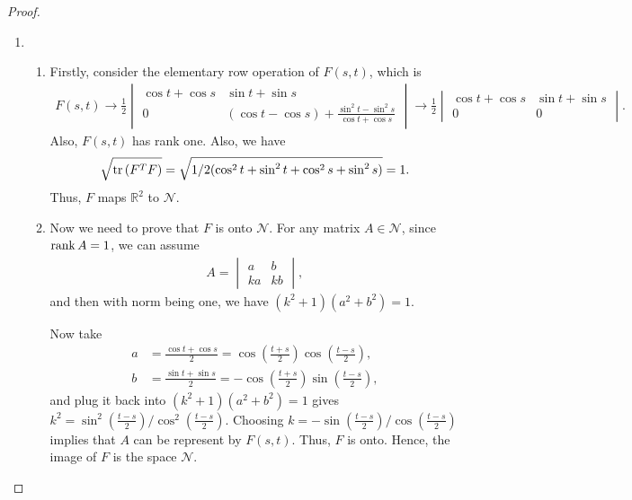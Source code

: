 \documentclass[11pt]{article}
\theoremstyle{definition}
\numberwithin{equation}{subsection}
\begin{document}
\begin{proof}
~\begin{enumerate}[label=(\alph*)]
    \item \begin{enumerate}[label=\arabic*)]
        \item Firstly, consider the elementary row operation of $F(s,t)$, which is
        \begin{align*}
            F(s,t) \to \frac{1}{2} 
            \begin{vmatrix}
                \cos t + \cos s & \sin t + \sin s \\
                0 & (\cos t - \cos s) + \frac{\sin^2 t - \sin^2 s}{\cos t + \cos s}
            \end{vmatrix} \to 
            \frac{1}{2}\begin{vmatrix}
                \cos t + \cos s & \sin t + \sin s \\
                0 & 0
            \end{vmatrix}.
        \end{align*}
        Also, $F(s,t)$ has rank one. Also, we have 
        $$\sqrt{{\rm tr} \left(F^T F\right)} = \sqrt{1/2 (\cos^2 t + \sin^2 t + \cos^2 s + \sin^2 s)} = 1.$$ 
        Thus, $F$ maps $\mathbb{R}^2$ to $\mathcal{N}$.
        
        \item Now we need to prove that $F$ is onto $\mathcal{N}$. For any matrix $A \in \mathcal{N}$, since $\rank A = 1$, we can assume 
        \begin{align*}
            A = \begin{vmatrix}
            a & b \\
            ka & kb
            \end{vmatrix},
        \end{align*}
        and then with norm being one, we have $(k^2 + 1)(a^2 + b^2) = 1$. 
        
        Now take\cite{5}
        \begin{align*}
            a & = \frac{\cos t + \cos s }{2} = \cos\left(\frac{t+s}{2}\right) \cos \left(\frac{t-s}{2}\right), \\
            b & = \frac{\sin t + \sin s }{2} = - \cos \left(\frac{t+s}{2}\right) \sin \left(\frac{t-s}{2}\right),
        \end{align*}
        and plug it back into $(k^2 + 1)(a^2 + b^2) = 1$ gives $k^2 = \sin^2 \left(\frac{t-s}{2}\right)/\cos^2 \left(\frac{t-s}{2}\right)$. Choosing $k = - \sin \left( \frac{t-s}{2} \right)/\cos \left( \frac{t-s}{2} \right)$ implies that $A$ can be represent by $F(s,t)$. Thus, $F$ is onto. Hence, the image of $F$ is the space $\mathcal{N}$.
    \end{enumerate}
    

\end{enumerate}
\end{proof}
\end{document}
